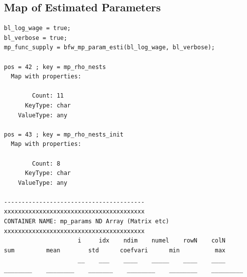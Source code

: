 \documentclass[
]{book}
\begin{document}
\hypertarget{map-of-estimated-parameters}{%
\subsection{Map of Estimated Parameters}\label{map-of-estimated-parameters}}

\begin{verbatim}
bl_log_wage = true;
bl_verbose = true;
mp_func_supply = bfw_mp_param_esti(bl_log_wage, bl_verbose);

pos = 42 ; key = mp_rho_nests
  Map with properties:

        Count: 11
      KeyType: char
    ValueType: any

pos = 43 ; key = mp_rho_nests_init
  Map with properties:

        Count: 8
      KeyType: char
    ValueType: any

----------------------------------------
xxxxxxxxxxxxxxxxxxxxxxxxxxxxxxxxxxxxxxxx
CONTAINER NAME: mp_params ND Array (Matrix etc)
xxxxxxxxxxxxxxxxxxxxxxxxxxxxxxxxxxxxxxxx
                     i     idx    ndim    numel    rowN    colN      sum         mean        std      coefvari      min          max   
                     __    ___    ____    _____    ____    ____    ________    ________    _______    ________    ________    _________


\end{verbatim}
\end{document}

